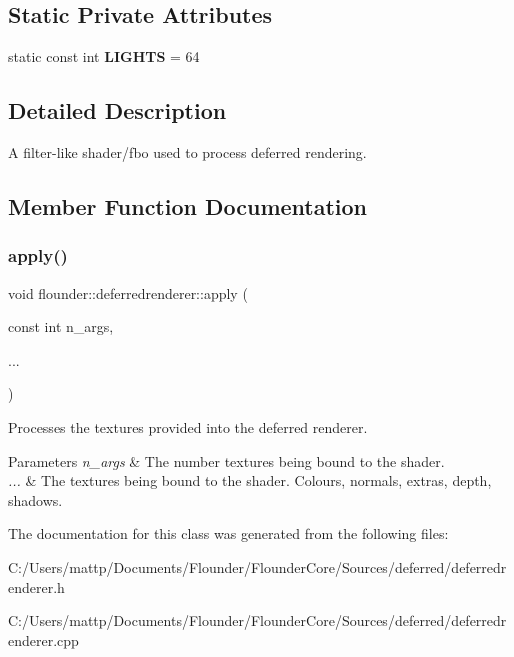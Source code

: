 \subsection*{Static Private Attributes}
\begin{DoxyCompactItemize}
\item 
\mbox{\label{classflounder_1_1deferredrenderer_a5f3e9727638d5476a66e69a521db1d40}} 
static const int {\bfseries L\+I\+G\+H\+TS} = 64
\end{DoxyCompactItemize}


\subsection{Detailed Description}
A filter-\/like shader/fbo used to process deferred rendering. 



\subsection{Member Function Documentation}
\mbox{\label{classflounder_1_1deferredrenderer_af369386b3a61385cd8ec2444662599c3}} 
\subsubsection{\texorpdfstring{apply()}{apply()}}
{\footnotesize\ttfamily void flounder\+::deferredrenderer\+::apply (\begin{DoxyParamCaption}\item[{const int}]{n\+\_\+args,  }\item[{}]{... }\end{DoxyParamCaption})}



Processes the textures provided into the deferred renderer. 


\begin{DoxyParams}{Parameters}
{\em n\+\_\+args} & The number textures being bound to the shader. \\
\hline
{\em ...} & The textures being bound to the shader. Colours, normals, extras, depth, shadows. \\
\hline
\end{DoxyParams}


The documentation for this class was generated from the following files\+:\begin{DoxyCompactItemize}
\item 
C\+:/\+Users/mattp/\+Documents/\+Flounder/\+Flounder\+Core/\+Sources/deferred/deferredrenderer.\+h\item 
C\+:/\+Users/mattp/\+Documents/\+Flounder/\+Flounder\+Core/\+Sources/deferred/deferredrenderer.\+cpp\end{DoxyCompactItemize}
